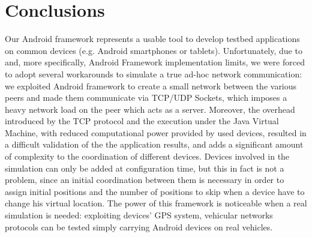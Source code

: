 \newpage
\section{Conclusions}

	Our Android framework represents a usable tool to develop testbed applications on common devices (e.g. Android smartphones or tablets). Unfortunately, due to \direct and, more specifically, Android \direct Framework implementation limits, we were forced to adopt several workarounds to simulate a true ad-hoc network communication: we exploited Android \direct framework to create a small network between the various peers and made them communicate via TCP/UDP Sockets, which imposes a heavy network load on the peer which acts as a server. Moreover, the overhead introduced by the TCP protocol and the execution under the Java Virtual Machine, with reduced computational power provided by used devices, resulted in a difficult validation of the the application results, and adds a significant amount of complexity to the coordination of different devices.
	Devices involved in the simulation can only be added at configuration time, but this in fact is not a problem, since an initial coordination between them is necessary in order to assign initial positions and the number of positions to skip when a device have to change his virtual location. 
	The power of this framework is noticeable when a real simulation is needed: exploiting devices' GPS system, vehicular networks protocols can be tested simply carrying Android devices on real vehicles. 
	
